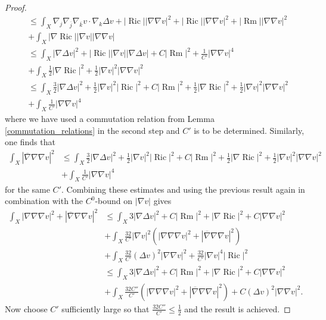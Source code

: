 \documentclass[12pt]{article}
\numberwithin{equation}{section}
\DeclareMathOperator{\Ric}{Ric}
\DeclareMathOperator{\Rm}{Rm}
\newcommand{\oo}[1]{\overline{#1}}
\begin{document}
\begin{proof}
{\begin{align*}
    &\leq \int_X \nabla_j \nabla_{\oo{j}} \nabla_{\oo{k}} v \cdot \nabla_k \Delta v + |\Ric||\nabla \nabla v|^2 + |\Ric||\nabla \nabla v|^2 + |\Rm||\nabla \nabla v|^2\\
    &+ \int_X |\nabla \Ric||\nabla v| |\nabla \nabla v|\\
    &\leq \int_X |\nabla \Delta v|^2 + |\Ric| |\nabla v| |\nabla \Delta v| + C|\Rm|^2 + \frac{1}{C'}|\nabla \nabla v|^4\\
    &+\int_X \frac{1}{2}|\nabla \Ric|^2 + \frac{1}{2}|\nabla v|^2 |\nabla \nabla v|^2\\
    &\leq \int_X \frac{3}{2}|\nabla \Delta v|^2 + \frac{1}{2} |\nabla v|^2 |\Ric|^2 + C|\Rm|^2 + \frac{1}{2}|\nabla\Ric|^2 + \frac{1}{2} |\nabla v|^2 |\nabla \nabla v|^2\\
    &+ \int_X \frac{1}{C'}|\nabla \nabla v|^4
\end{align*}
}
where  we have used a commutation relation from Lemma \ref{commutation_relations} in the second step and $C'$ is to be determined. Similarly, one finds that
\begin{align*}
    \int_X |\oo{\nabla} \nabla \nabla v|^2 &\leq \int_X \frac{3}{2}|\nabla \Delta v|^2 + \frac{1}{2} |\nabla v|^2 |\Ric|^2 + C|\Rm|^2 + \frac{1}{2}|\nabla\Ric|^2 + \frac{1}{2} |\nabla v|^2 |\nabla \nabla v|^2\\
    &+ \int_X \frac{1}{C'}|\nabla \nabla v|^4
\end{align*}
for the same $C'$. Combining these estimates and using the previous result again in combination with the $C^0$-bound on $|\nabla v|$ gives
\begin{align*}
    \int_X |\nabla \nabla \nabla v|^2 + |\oo{\nabla} \nabla\nabla v|^2 &\leq \int_X 3|\nabla \Delta v|^2 + C|\Rm|^2+ |\nabla \Ric|^2 + C|\nabla \nabla v|^2\\
    &+ \int_X \frac{32}{C'} |\nabla v|^2 (|\nabla \nabla \nabla v|^2 + |\oo{\nabla} \nabla \nabla v|^2)\\
    &+ \int_X \frac{32}{C'}(\Delta v)^2 |\nabla \nabla v|^2 + \frac{32}{C'} |\nabla v|^4|\Ric|^2\\
    &\leq \int_X 3|\nabla \Delta v|^2 + C|\Rm|^2+ |\nabla \Ric|^2 + C|\nabla \nabla v|^2\\
    &+ \int_X \frac{32C''}{C'} (|\nabla \nabla \nabla v|^2 + |\oo{\nabla} \nabla \nabla v|^2)+ C(\Delta v)^2 |\nabla \nabla v|^2.
\end{align*}
Now choose $C'$ sufficiently large so that $\frac{32C''}{C'} \leq \frac{1}{2}$ and the result is achieved.
\end{proof}
\end{document}
